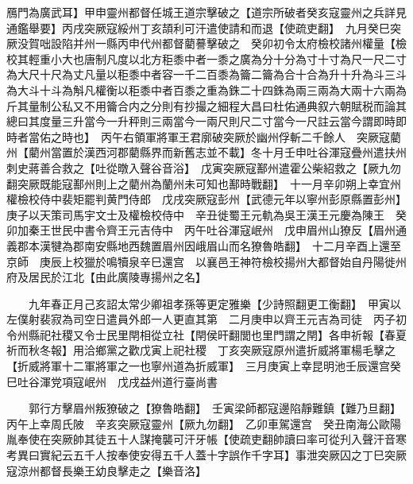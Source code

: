 鴈門為廣武耳】甲申靈州都督任城王道宗擊破之【道宗所破者癸亥寇靈州之兵詳見通鑑舉要】丙戌突厥寇綏州丁亥頡利可汗遣使請和而退【使疏吏翻】　九月癸巳突厥没賀咄設陷并州一縣丙申代州都督藺謩擊破之　癸卯初令太府檢校諸州權量【檢校其輕重小大也唐制凡度以北方秬黍中者一黍之廣為分十分為寸十寸為尺一尺二寸為大尺十尺為丈凡量以秬黍中者容一千二百黍為籥二籥為合十合為升十升為斗三斗為大斗十斗為斛凡權衡以秬黍中者百黍之重為銖二十四銖為兩三兩為大兩十六兩為斤其量制公私又不用籥合内之分則有抄撮之細程大昌曰杜佑通典叙六朝賦税而論其總曰其度量三升當今一升秤則三兩當今一兩尺則尺二寸當今一尺註云當今謂即時即時者當佑之時也】　丙午右領軍將軍王君廓破突厥於幽州俘斬二千餘人　突厥寇藺州【藺州當置於漢西河郡藺縣界而新舊志並不載】冬十月壬申吐谷渾寇疊州遣扶州刺史蔣善合救之【吐從暾入聲谷音浴】　戊寅突厥寇鄯州遣霍公柴紹救之【厥九勿翻突厥既能寇鄯州則上之藺州為蘭州未可知也鄯時戰翻】　十一月辛卯朔上幸宜州　權檢校侍中裴矩罷判黄門侍郎　戊戌突厥寇彭州【武德元年以寧州彭原縣置彭州】　庚子以天策司馬宇文士及權檢校侍中　辛丑徙蜀王元軌為吳王漢王元慶為陳王　癸卯加秦王世民中書令齊王元吉侍中　丙午吐谷渾寇岷州　戊申眉州山獠反【眉州通義郡本漢犍為郡南安縣地西魏置眉州因峨眉山而名獠魯皓翻】　十二月辛酉上還至京師　庚辰上校獵於鳴犢泉辛巳還宫　以襄邑王神符檢校揚州大都督始自丹陽徙州府及居民於江北【由此廣陵專揚州之名】

　　九年春正月己亥詔太常少卿祖孝孫等更定雅樂【少詩照翻更工衡翻】　甲寅以左僕射裴寂為司空日遣員外郎一人更直其第　二月庚申以齊王元吉為司徒　丙子初令州縣祀社稷又令士民里閈相從立社【閈侯旰翻閭也里門謂之閈】各申祈報【春夏祈而秋冬報】用洽鄉黨之歡戊寅上祀社稷　丁亥突厥寇原州遣折威將軍楊毛擊之【折威將軍十二軍將軍之一也寧州道為折威軍】　三月庚寅上幸昆明池壬辰還宫癸巳吐谷渾党項寇岷州　戊戌益州道行臺尚書

　　郭行方擊眉州叛獠破之【獠魯皓翻】　壬寅梁師都寇邊陷靜難鎮【難乃旦翻】　丙午上幸周氏陂　辛亥突厥寇靈州【厥九勿翻】　乙卯車駕還宫　癸丑南海公歐陽胤奉使在突厥帥其徒五十人謀掩襲可汗牙帳【使疏吏翻帥讀曰率可從刋入聲汗音寒　考異曰實紀云五千人按奉使安得五千人蓋十字誤作千字耳】事泄突厥囚之丁巳突厥寇涼州都督長樂王幼良擊走之【樂音洛】


